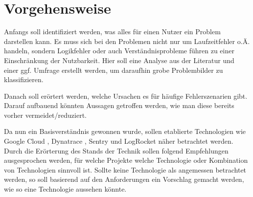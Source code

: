 \section{Vorgehensweise}

Anfangs soll identifiziert werden, was alles für einen Nutzer ein Problem darstellen kann. Es muss sich bei den Problemen nicht nur um Laufzeitfehler o.Ä. handeln, sondern Logikfehler oder auch Verständnisprobleme führen zu einer Einschränkung der Nutzbarkeit. Hier soll eine Analyse aus der Literatur und einer ggf. Umfrage erstellt werden, um daraufhin grobe Problembilder zu klassifizieren.

Danach soll erörtert werden, welche Ursachen es für häufige Fehlerszenarien gibt. Darauf aufbauend könnten Aussagen getroffen werden, wie man diese bereits vorher vermeidet/reduziert.

Da nun ein Basisverständnis gewonnen wurde, sollen etablierte Technologien wie Google Cloud \cite{GoogleCloudErrorReporting}, Dynatrace \cite{DynatraceDigitalExperienceMonitoring}, Sentry \cite{SentryForJavaScript} und LogRocket \cite{LogRocket} näher betrachtet werden. Durch die Erörterung des Stands der Technik sollen folgend Empfehlungen ausgesprochen werden, für welche Projekte welche Technologie oder Kombination von Technologien sinnvoll ist. Sollte keine Technologie als angemessen betrachtet werden, so soll basierend auf den Anforderungen ein Vorschlag gemacht werden, wie so eine Technologie aussehen könnte.
